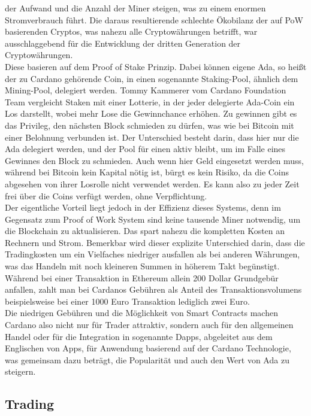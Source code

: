 \documentclass[12pt]{article}
\begin{document}
der Aufwand und die Anzahl der Miner steigen, was zu einem enormen Stromverbrauch führt. Die daraus resultierende schlechte Ökobilanz der auf PoW basierenden Cryptos, was nahezu alle Cryptowährungen betrifft, war ausschlaggebend für die Entwicklung der dritten Generation der Cryptowährungen.\\
		Diese basieren auf dem Proof of Stake Prinzip. Dabei können eigene Ada, so heißt der zu Cardano gehörende Coin, in einen sogenannte Staking-Pool, ähnlich dem Mining-Pool, delegiert werden. Tommy Kammerer vom Cardano Foundation Team vergleicht Staken mit einer Lotterie, in der jeder delegierte Ada-Coin ein Los darstellt, wobei mehr Lose die Gewinnchance erhöhen. Zu gewinnen gibt es das Privileg, den nächsten Block schmieden zu dürfen, was wie bei Bitcoin mit einer Belohnung verbunden ist. Der Unterschied besteht darin, dass hier nur die Ada delegiert werden, und der Pool für einen aktiv bleibt, um im Falle eines Gewinnes den Block zu schmieden. Auch wenn hier Geld eingesetzt werden muss, während bei Bitcoin kein Kapital nötig ist, bürgt es kein Risiko, da die Coins abgesehen von ihrer Losrolle nicht verwendet werden. Es kann also zu jeder Zeit frei über die Coins verfügt werden, ohne Verpflichtung.\\
		Der eigentliche Vorteil liegt jedoch in der Effizienz dieses Systems, denn im Gegensatz zum Proof of Work System sind keine tausende Miner notwendig, um die Blockchain zu aktualisieren. Das spart nahezu die kompletten Kosten an Rechnern und Strom. Bemerkbar wird dieser explizite Unterschied darin, dass die Tradingkosten um ein Vielfaches niedriger ausfallen als bei anderen Währungen, was das Handeln mit noch kleineren Summen in höherem Takt begünstigt. Während bei einer Transaktion in Ethereum allein 200 Dollar Grundgebür anfallen, zahlt man bei Cardanos Gebühren als Anteil des Transaktionsvolumens beispielsweise bei einer 1000 Euro Transaktion lediglich zwei Euro.\\
		Die niedrigen Gebühren und die Möglichkeit von Smart Contracts machen Cardano also nicht nur für Trader attraktiv, sondern auch für den allgemeinen Handel oder für die Integration in sogenannte Dapps, abgeleitet aus dem Englischen von Apps, für Anwendung basierend auf der Cardano Technologie, was gemeinsam dazu beträgt, die Popularität und auch den Wert von Ada zu steigern.

\subsection{Trading}
\end{document}
